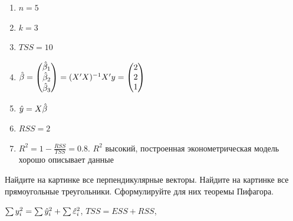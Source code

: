 \begin{problem}
\begin{sol}
\begin{enumerate}
\item $n = 5$
\item $k = 3$
\item $TSS = 10$
\item $\hat{\beta} = \begin{pmatrix} \hat{\beta}_1 \\ \hat{\beta}_2 \\ \hat{\beta}_3 \end{pmatrix} = (X'X)^{-1}X'y = \begin{pmatrix} 2 \\ 2 \\ 1 \end{pmatrix}$
\item $\hat{y} = X\hat{\beta}$
\item $RSS = 2$
\item $R^2 = 1 - \frac {RSS}{TSS} = 0.8.$ $R^2$ высокий, построенная эконометрическая модель хорошо описывает данные
\end{enumerate}
\end{sol}
\end{problem}



\begin{problem}
Найдите на картинке все перпендикулярные векторы. Найдите на картинке все прямоугольные треугольники. Сформулируйте для них теоремы Пифагора.






\begin{sol}
$\sum y_i^2=\sum \hat{y}_i^2+\sum \hat{\varepsilon}_i^2$, $TSS=ESS+RSS$,
\end{sol}
\end{problem}



